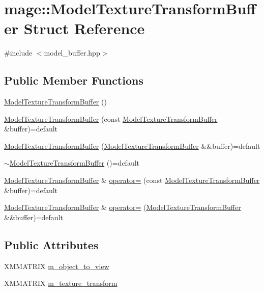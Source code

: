 \hypertarget{structmage_1_1_model_texture_transform_buffer}{}\section{mage\+:\+:Model\+Texture\+Transform\+Buffer Struct Reference}
\label{structmage_1_1_model_texture_transform_buffer}


{\ttfamily \#include $<$model\+\_\+buffer.\+hpp$>$}

\subsection*{Public Member Functions}
\begin{DoxyCompactItemize}
\item 
\hyperlink{structmage_1_1_model_texture_transform_buffer_a500d8232f1350b0beccc2181951309d6}{Model\+Texture\+Transform\+Buffer} ()
\item 
\hyperlink{structmage_1_1_model_texture_transform_buffer_a5b0c7030b2e48302e6c071935a4bc7d5}{Model\+Texture\+Transform\+Buffer} (const \hyperlink{structmage_1_1_model_texture_transform_buffer}{Model\+Texture\+Transform\+Buffer} \&buffer)=default
\item 
\hyperlink{structmage_1_1_model_texture_transform_buffer_a35516b344752486fa40cd14b59e17ec9}{Model\+Texture\+Transform\+Buffer} (\hyperlink{structmage_1_1_model_texture_transform_buffer}{Model\+Texture\+Transform\+Buffer} \&\&buffer)=default
\item 
\hyperlink{structmage_1_1_model_texture_transform_buffer_a855c8ccaefe9bac3fd10cdc143616cd9}{$\sim$\+Model\+Texture\+Transform\+Buffer} ()=default
\item 
\hyperlink{structmage_1_1_model_texture_transform_buffer}{Model\+Texture\+Transform\+Buffer} \& \hyperlink{structmage_1_1_model_texture_transform_buffer_a4fd72713afb7e68208c0356a2b55f3d9}{operator=} (const \hyperlink{structmage_1_1_model_texture_transform_buffer}{Model\+Texture\+Transform\+Buffer} \&buffer)=default
\item 
\hyperlink{structmage_1_1_model_texture_transform_buffer}{Model\+Texture\+Transform\+Buffer} \& \hyperlink{structmage_1_1_model_texture_transform_buffer_a025ad62973c7ae20b8e977f94c509a54}{operator=} (\hyperlink{structmage_1_1_model_texture_transform_buffer}{Model\+Texture\+Transform\+Buffer} \&\&buffer)=default
\end{DoxyCompactItemize}
\subsection*{Public Attributes}
\begin{DoxyCompactItemize}
\item 
X\+M\+M\+A\+T\+R\+IX \hyperlink{structmage_1_1_model_texture_transform_buffer_adb5e9e5b5d8c48267f0947c1ebc67b27}{m\+\_\+object\+\_\+to\+\_\+view}
\item 
X\+M\+M\+A\+T\+R\+IX \hyperlink{structmage_1_1_model_texture_transform_buffer_aec121458581c6508c8caaab65b073b73}{m\+\_\+texture\+\_\+transform}
\end{DoxyCompactItemize}


